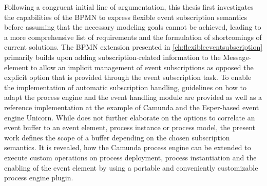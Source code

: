 Following a congruent initial line of argumentation, this thesis first investigates the capabilities of the BPMN to express flexible event subscription semantics before assuming that the necessary modeling goals cannot be achieved, leading to a more comprehensive list of requirements and the formulation of shortcomings of current solutions.
The BPMN extension presented in \autoref{ch:flexibleeventsubscription} primarily builds upon adding subscription-related information to the Message-element to allow an implicit management of event subscriptions as opposed the explicit option that is provided through the event subscription task.
To enable the implementation of automatic subscription handling, guidelines on how to adapt the process engine and the event handling module are provided as well as a reference implementation at the example of Camunda and the Esper-based event engine Unicorn.
While \cite{mandal:2017} does not further elaborate on the options to correlate an event buffer to an event element, process instance or process model, the present work defines the scope of a buffer depending on the chosen subscription semantics.
It is revealed, how the Camunda process engine can be extended to execute custom operations on process deployment, process instantiation and the enabling of the event element by using a portable and conveniently customizable process engine plugin. %




